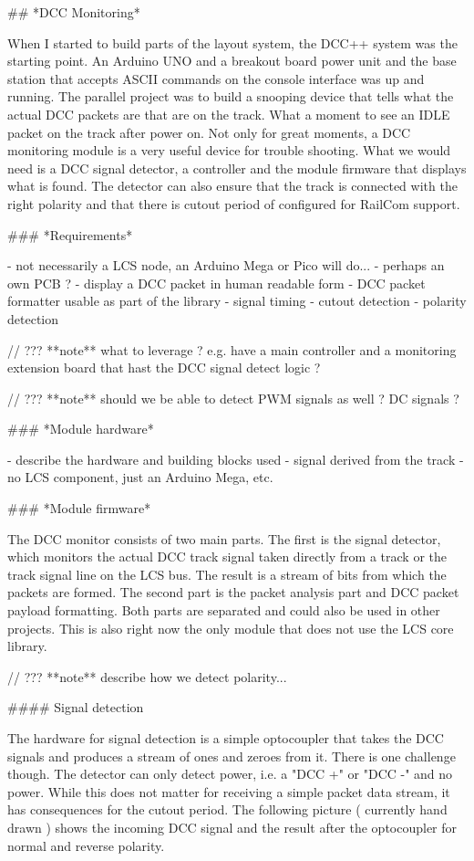 ## *DCC Monitoring*

When I started to build parts of the layout system, the DCC++ system was the starting point. An Arduino UNO and a breakout board power unit and the base station that accepts ASCII commands on the console interface was up and running. The parallel project was to build a snooping device that tells what the actual DCC packets are that are on the track. What a moment to see an IDLE packet on the track after power on. Not only for great moments, a DCC monitoring module is a very useful device for trouble shooting. What we would need is a DCC signal detector, a controller and the module firmware that displays what is found. The detector can also ensure that the track is connected with the right polarity and that there is cutout period of configured for RailCom support.

### *Requirements*

- not necessarily a LCS node, an Arduino Mega or Pico will do...
- perhaps an own PCB ?
- display a DCC packet in human readable form
- DCC packet formatter usable as part of the library
- signal timing
- cutout detection
- polarity detection

// ??? **note** what to leverage ? e.g. have a main controller and a monitoring extension board that hast the DCC signal detect logic ?

// ??? **note** should we be able to detect PWM signals as well ? DC signals ?


### *Module hardware*

- describe the hardware and building blocks used
- signal derived from the track
- no LCS component, just an Arduino Mega, etc.


### *Module firmware*

The DCC monitor consists of two main parts. The first is the signal detector, which monitors the actual DCC track signal taken directly from a track or the track signal line on the LCS bus. The result is a stream of bits from which the packets are formed. The second part is the packet analysis part and DCC packet payload formatting. Both parts are separated and could also be used in other projects. This is also right now the only module that does not use the LCS core library.

// ??? **note** describe how we detect polarity...

#### Signal detection

The hardware for signal detection is a simple optocoupler that takes the DCC signals and produces a stream of ones and zeroes from it. There is one challenge though. The detector can only detect power, i.e. a "DCC +" or "DCC -" and no power. While this does not matter for receiving a simple packet data stream, it has consequences for the cutout period. The following picture ( currently hand drawn ) shows the incoming DCC signal and the result after the optocoupler for normal and reverse polarity.

